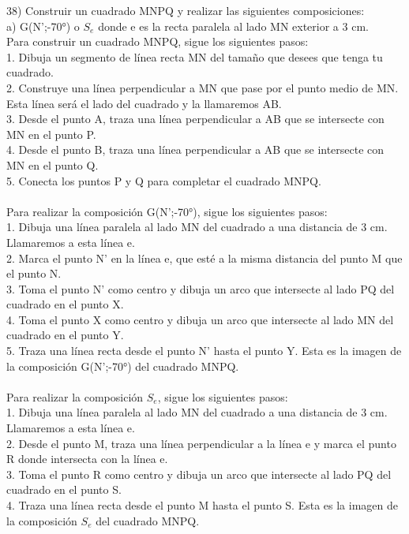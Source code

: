 \documentclass{article}
\begin{document}
38)  Construir un cuadrado MNPQ y realizar las siguientes composiciones:\\
a) G(N’;-70°) o $S_e$ donde e es la recta paralela al lado MN exterior a 3 cm.\\
Para construir un cuadrado MNPQ, sigue los siguientes pasos:\\
1. Dibuja un segmento de línea recta MN del tamaño que desees que tenga tu cuadrado.\\
2. Construye una línea perpendicular a MN que pase por el punto medio de MN. Esta línea será el lado del cuadrado y la llamaremos AB.\\
3. Desde el punto A, traza una línea perpendicular a AB que se intersecte con MN en el punto P.\\
4. Desde el punto B, traza una línea perpendicular a AB que se intersecte con MN en el punto Q.\\
5. Conecta los puntos P y Q para completar el cuadrado MNPQ.\\
\\
Para realizar la composición G(N’;-70°), sigue los siguientes pasos:\\
1. Dibuja una línea paralela al lado MN del cuadrado a una distancia de 3 cm. Llamaremos a esta línea e.\\
2. Marca el punto N' en la línea e, que esté a la misma distancia del punto M que el punto N.\\
3. Toma el punto N' como centro y dibuja un arco que intersecte al lado PQ del cuadrado en el punto X.\\
4. Toma el punto X como centro y dibuja un arco que intersecte al lado MN del cuadrado en el punto Y.\\
5. Traza una línea recta desde el punto N' hasta el punto Y. Esta es la imagen de la composición G(N’;-70°) del cuadrado MNPQ.\\
\\
Para realizar la composición $S_e$, sigue los siguientes pasos:\\
1. Dibuja una línea paralela al lado MN del cuadrado a una distancia de 3 cm. Llamaremos a esta línea e.\\
2. Desde el punto M, traza una línea perpendicular a la línea e y marca el punto R donde intersecta con la línea e.\\
3. Toma el punto R como centro y dibuja un arco que intersecte al lado PQ del cuadrado en el punto S.\\
4. Traza una línea recta desde el punto M hasta el punto S. Esta es la imagen de la composición $S_e$ del cuadrado MNPQ.\\
\end{document}
